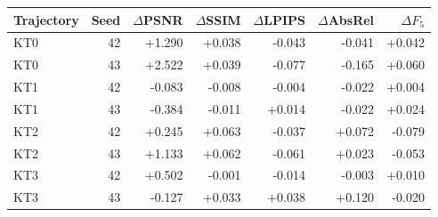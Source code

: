 \begin{tabular}{lrrrrrr}
\toprule
Trajectory & Seed & $\Delta$PSNR & $\Delta$SSIM & $\Delta$LPIPS & $\Delta$AbsRel & $\Delta F_5$ \\
\midrule
KT0 & 42 & +1.290 & +0.038 & -0.043 & -0.041 & +0.042 \\
KT0 & 43 & +2.522 & +0.039 & -0.077 & -0.165 & +0.060 \\
KT1 & 42 & -0.083 & -0.008 & -0.004 & -0.022 & +0.004 \\
KT1 & 43 & -0.384 & -0.011 & +0.014 & -0.022 & +0.024 \\
KT2 & 42 & +0.245 & +0.063 & -0.037 & +0.072 & -0.079 \\
KT2 & 43 & +1.133 & +0.062 & -0.061 & +0.023 & -0.053 \\
KT3 & 42 & +0.502 & -0.001 & -0.014 & -0.003 & +0.010 \\
KT3 & 43 & -0.127 & +0.033 & +0.038 & +0.120 & -0.020 \\
\bottomrule
\end{tabular}
